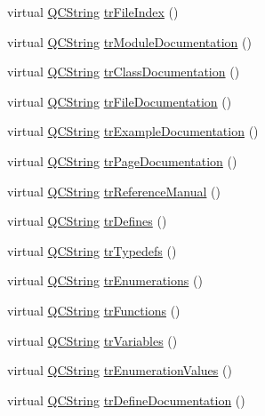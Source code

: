 \begin{DoxyCompactItemize}
\item 
virtual \hyperlink{class_q_c_string}{Q\-C\-String} \hyperlink{class_translator_catalan_ad31a22beb2f300011b5d84c896efed48}{tr\-File\-Index} ()
\item 
virtual \hyperlink{class_q_c_string}{Q\-C\-String} \hyperlink{class_translator_catalan_a2f997aa177e7016c7ab42e3a04677bbd}{tr\-Module\-Documentation} ()
\item 
virtual \hyperlink{class_q_c_string}{Q\-C\-String} \hyperlink{class_translator_catalan_ad110ea7837f16d330713712fbc45f3ef}{tr\-Class\-Documentation} ()
\item 
virtual \hyperlink{class_q_c_string}{Q\-C\-String} \hyperlink{class_translator_catalan_a5208d68e101288c987a9c3460f4708f8}{tr\-File\-Documentation} ()
\item 
virtual \hyperlink{class_q_c_string}{Q\-C\-String} \hyperlink{class_translator_catalan_a21a3f1a3c620fec9b4f7f8ecc21fff8e}{tr\-Example\-Documentation} ()
\item 
virtual \hyperlink{class_q_c_string}{Q\-C\-String} \hyperlink{class_translator_catalan_a7cf8ab505f757f138ca06e41097d7e8d}{tr\-Page\-Documentation} ()
\item 
virtual \hyperlink{class_q_c_string}{Q\-C\-String} \hyperlink{class_translator_catalan_a2c056f492d9d9bfc42e365c9a72f690f}{tr\-Reference\-Manual} ()
\item 
virtual \hyperlink{class_q_c_string}{Q\-C\-String} \hyperlink{class_translator_catalan_aa64bcd419328b32bfc89195cf544cbbc}{tr\-Defines} ()
\item 
virtual \hyperlink{class_q_c_string}{Q\-C\-String} \hyperlink{class_translator_catalan_ac46d406eb9bb5b176aae39b6c502d8ed}{tr\-Typedefs} ()
\item 
virtual \hyperlink{class_q_c_string}{Q\-C\-String} \hyperlink{class_translator_catalan_a4ee6ca6fa76e56b5404130aaaf698085}{tr\-Enumerations} ()
\item 
virtual \hyperlink{class_q_c_string}{Q\-C\-String} \hyperlink{class_translator_catalan_a167145cf16c86e425b98e2cedaeb30b8}{tr\-Functions} ()
\item 
virtual \hyperlink{class_q_c_string}{Q\-C\-String} \hyperlink{class_translator_catalan_ab9d317c84bc4abb3da70fa921e542d55}{tr\-Variables} ()
\item 
virtual \hyperlink{class_q_c_string}{Q\-C\-String} \hyperlink{class_translator_catalan_a5b53beb7849e7952f7887b398b5adf9d}{tr\-Enumeration\-Values} ()
\item 
virtual \hyperlink{class_q_c_string}{Q\-C\-String} \hyperlink{class_translator_catalan_a1c23aba98edb190847a7d510a4ed24fc}{tr\-Define\-Documentation} ()

\end{DoxyCompactItemize}
